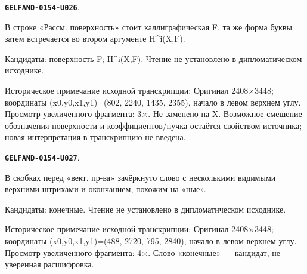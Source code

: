 \documentclass[11pt]{article}
\theoremstyle{definition}
\theoremstyle{remark}
\begin{document}
\par\noindent\leavevmode{}\label{GELFAND-0154-U026}\label{GELFAND-P001421:surface-symbol:note}\textbf{\texttt{GELFAND-0154-U026}}.\nopagebreak[4]\par
В строке «Рассм. поверхность» стоит каллиграфическая F, та же форма буквы затем встречается во втором аргументе H\textasciicircum{}i(X,F).\par
Кандидаты: поверхность F; H\textasciicircum{}i(X,F). Чтение не установлено в дипломатическом исходнике.\par
Историческое примечание исходной транскрипции: Оригинал 2408×3448; координаты (x0,y0,x1,y1)=(802, 2240, 1435, 2355), начало в левом верхнем углу. Просмотр увеличенного фрагмента: 3×. Не заменено на X. Возможное смешение обозначения поверхности и коэффициентов/пучка остаётся свойством источника; новая интерпретация в транскрипцию не введена.\par\medskip
\par\noindent\leavevmode{}\label{GELFAND-0154-U027}\label{GELFAND-P001421:before-vector-spaces-cancelled:note}\textbf{\texttt{GELFAND-0154-U027}}.\nopagebreak[4]\par
В скобках перед «вект. пр-ва» зачёркнуто слово с несколькими видимыми верхними штрихами и окончанием, похожим на «ные».\par
Кандидаты: конечные. Чтение не установлено в дипломатическом исходнике.\par
Историческое примечание исходной транскрипции: Оригинал 2408×3448; координаты (x0,y0,x1,y1)=(488, 2720, 795, 2840), начало в левом верхнем углу. Просмотр увеличенного фрагмента: 4×. Слово «конечные» — кандидат, не уверенная расшифровка.\par\medskip
\end{document}
